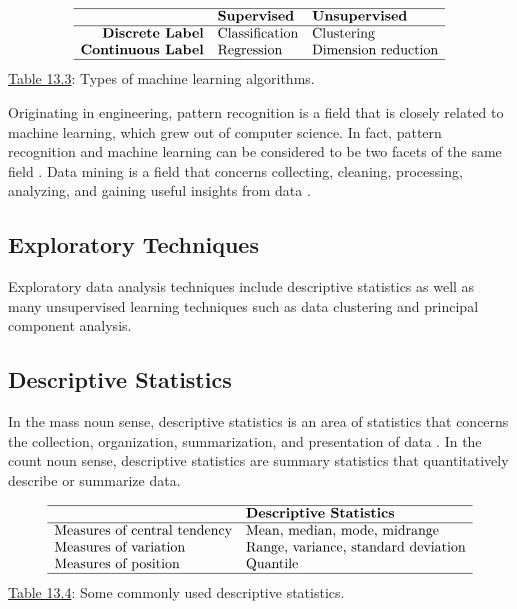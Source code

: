 \documentclass[]{book}
\theoremstyle{definition}
\theoremstyle{definition}
\theoremstyle{definition}
\theoremstyle{remark}
\begin{document}
\[\begin{matrix}
\begin{array}{rll} \hline
& \textbf{Supervised} & \textbf{Unsupervised} \\\hline
\textbf{Discrete Label} & \text{Classification} & \text{Clustering} \\
\textbf{Continuous Label} & \text{Regression} & \text{Dimension reduction} \\
\hline
\end{array}
\end{matrix}
\] \protect\hyperlink{tab:13.3}{Table 13.3}: Types of machine learning
algorithms.

Originating in engineering, pattern recognition is a field that is
closely related to machine learning, which grew out of computer science.
In fact, pattern recognition and machine learning can be considered to
be two facets of the same field \citep{bishop2007}. Data mining is a
field that concerns collecting, cleaning, processing, analyzing, and
gaining useful insights from data \citep{aggarwal2015}.

\subsection{Exploratory Techniques}\label{exploratory-techniques}

Exploratory data analysis techniques include descriptive statistics as
well as many unsupervised learning techniques such as data clustering
and principal component analysis.

\subsection{Descriptive Statistics}\label{descriptive-statistics}

In the mass noun sense, descriptive statistics is an area of statistics
that concerns the collection, organization, summarization, and
presentation of data \citep{bluman2012}. In the count noun sense,
descriptive statistics are summary statistics that quantitatively
describe or summarize data.

\[\begin{matrix}
\begin{array}{ll} \hline
& \textbf{Descriptive Statistics} \\\hline
\text{Measures of central tendency} & \text{Mean, median, mode, midrange}\\
\text{Measures of variation} & \text{Range, variance, standard deviation} \\
\text{Measures of position} & \text{Quantile} \\
\hline
\end{array}
\end{matrix}
\] \protect\hyperlink{tab:13.4}{Table 13.4}: Some commonly used
descriptive statistics.
\end{document}
